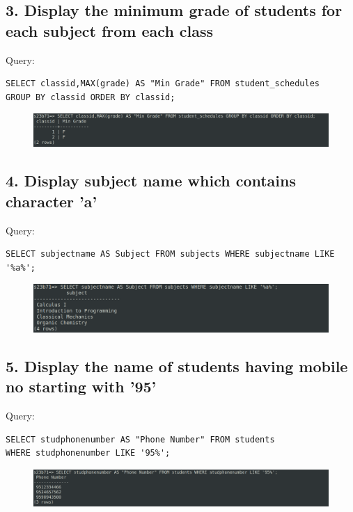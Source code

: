 \documentclass{article}
\begin{document}
\subsection*{3. Display the minimum grade of students for each subject from each class}
Query:
\begin{Verbatim}[frame=single,framerule=1pt,fontfamily=courier,fontsize=\small]
SELECT classid,MAX(grade) AS "Min Grade" FROM student_schedules 
GROUP BY classid ORDER BY classid;
\end{Verbatim}
\begin{figure}[H]
    \centering
    \includegraphics[width=\textwidth]{cycle3/3.3.png}
\end{figure}

\subsection*{4. Display subject name which contains character 'a'}
Query:
\begin{Verbatim}[frame=single,framerule=1pt,fontfamily=courier,fontsize=\small]
SELECT subjectname AS Subject FROM subjects WHERE subjectname LIKE '%a%';
\end{Verbatim}
\begin{figure}[H]
    \centering
    \includegraphics[width=\textwidth]{cycle3/3.4.png}
\end{figure}

\subsection*{5. Display the name of students having mobile no starting with '95'}
Query:
\begin{Verbatim}[frame=single,framerule=1pt,fontfamily=courier,fontsize=\small]
SELECT studphonenumber AS "Phone Number" FROM students 
WHERE studphonenumber LIKE '95%';
\end{Verbatim}
\begin{figure}[H]
    \centering
    \includegraphics[width=\textwidth]{cycle3/3.5.png}
\end{figure}
\end{document}
